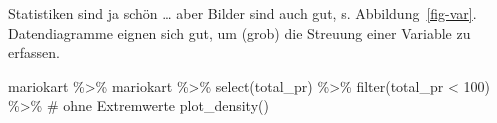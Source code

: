 \documentclass[
  a4paper,
]{scrbook}
\newenvironment{Shaded}{\begin{snugshade}}{\end{snugshade}}
\newcommand{\CommentTok}[1]{\textcolor[rgb]{0.37,0.37,0.37}{#1}}
\newcommand{\DecValTok}[1]{\textcolor[rgb]{0.68,0.00,0.00}{#1}}
\newcommand{\FunctionTok}[1]{\textcolor[rgb]{0.28,0.35,0.67}{#1}}
\newcommand{\NormalTok}[1]{\textcolor[rgb]{0.00,0.23,0.31}{#1}}
\newcommand{\SpecialCharTok}[1]{\textcolor[rgb]{0.37,0.37,0.37}{#1}}
\theoremstyle{definition}
\theoremstyle{definition}
\theoremstyle{definition}
\theoremstyle{remark}
\begin{document}
Statistiken sind ja schön \ldots{} aber Bilder sind auch gut, s.
Abbildung~\ref{fig-var}. Datendiagramme eignen sich gut, um (grob) die
Streuung einer Variable zu erfassen.

\begin{Shaded}
\begin{Highlighting}[]
\NormalTok{mariokart }\SpecialCharTok{\%\textgreater{}\%} 
\NormalTok{  mariokart }\SpecialCharTok{\%\textgreater{}\%} 
  \FunctionTok{select}\NormalTok{(total\_pr) }\SpecialCharTok{\%\textgreater{}\%} 
  \FunctionTok{filter}\NormalTok{(total\_pr }\SpecialCharTok{\textless{}} \DecValTok{100}\NormalTok{) }\SpecialCharTok{\%\textgreater{}\%}  \CommentTok{\# ohne Extremwerte}
  \FunctionTok{plot\_density}\NormalTok{()}
\end{Highlighting}
\end{Shaded}
\end{document}

